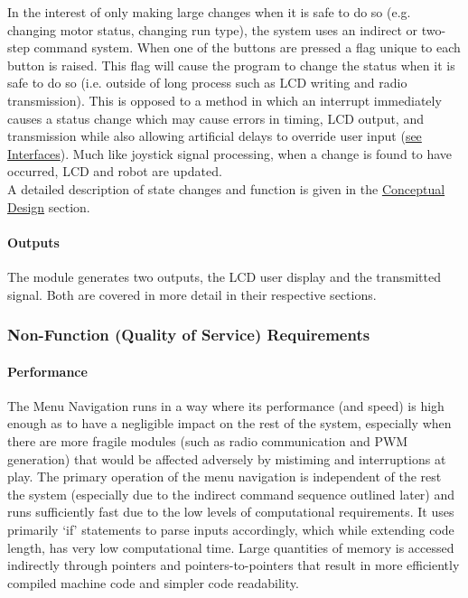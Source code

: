 	In the interest of only making large changes when it is safe to do so (e.g. changing motor status, changing run type), the system uses an indirect or two-step command system. When one of the buttons are pressed a flag unique to each button is raised. This flag will cause the program to change the status when it is safe to do so (i.e. outside of long process such as LCD writing and radio transmission). This is opposed to a method in which an interrupt immediately causes a status change which may cause errors in timing, LCD output, and transmission while also allowing artificial delays to override user input (\underline{see Interfaces}). Much like joystick signal processing, when a change is found to have occurred, LCD and robot are updated.\\
	
	A detailed description of state changes and function is given in the \underline{Conceptual Design} section.
	
	
	\paragraph{Outputs}
	
	The module generates two outputs, the LCD user display and the transmitted signal. Both are covered in more detail in their respective sections.

	
	\subsubsection{Non-Function (Quality of Service) Requirements}

	\paragraph{Performance}
	
	The Menu Navigation runs in a way where its performance (and speed) is high enough as to have a negligible impact on the rest of the system, especially when there are more fragile modules (such as radio communication and PWM generation) that would be affected adversely by mistiming and interruptions at play. The primary operation of the menu navigation is independent of the rest the system (especially due to the indirect command sequence outlined later) and runs sufficiently fast due to the low levels of computational requirements. It uses primarily `if' statements to parse inputs accordingly, which while extending code length, has very low computational time. Large quantities of memory is accessed indirectly through pointers and pointers-to-pointers that result in more efficiently compiled machine code and simpler code readability.
	
